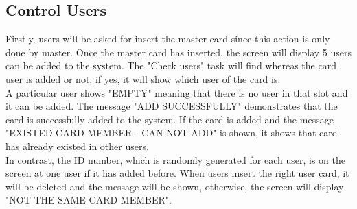\documentclass[12pt, a4paper, oneside]{article}
\begin{document}
\subsection{Control Users}
Firstly, users will be asked for insert the master card since this action is only done by master. Once the master card has inserted, the screen will display 5 users can be added to the system. The "Check users" task will find whereas the card user is added or not, if yes, it will show which user of the card is. \\
A particular user shows "EMPTY" meaning that there is no user in that slot and it can be added. The message "ADD SUCCESSFULLY" demonstrates that the card is successfully added to the system. If the card is added and the message "EXISTED CARD MEMBER - CAN NOT ADD" is shown, it shows that card has already existed in other users. \\
In contrast, the ID number, which is randomly generated for each user, is on the screen at one user if it has added before. When users insert the right user card, it will be deleted and the message will be shown, otherwise, the screen will display "NOT THE SAME CARD MEMBER". \\

	
\end{document}
